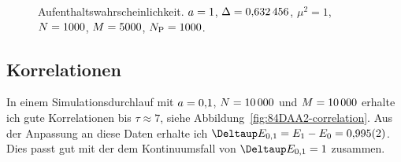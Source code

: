 \begin{figure}[htbp]
    \centering
    \caption{%
        Aufenthaltswahrscheinlichkeit. $a =
        \num{1}$, $\Delta = \num{0.632456}$, $\mu^2 = \num{1}$, $N =
        \num{1000}$, $M = \num{5000}$, $N_\text P = \num{1000}$.
    }
    \label{fig:histogram_10}
\end{figure}

\subsection{Korrelationen}

In einem Simulationsdurchlauf mit $a = \num{0.1}$, $N =
\num{10000}$ und $M = \num{10000}$ erhalte ich gute Korrelationen bis
$\tau \approx \num{7}$, siehe Abbildung~\ref{fig:84DAA2-correlation}. Aus der
Anpassung an diese Daten erhalte ich $\Deltaup E_{0,1} = E_1 - E_0 = \num{0.995
    +- 0.002}$. Dies passt gut mit der dem Kontinuumsfall von $\Deltaup E_{0,1}
    = \num{1}$ zusammen.

